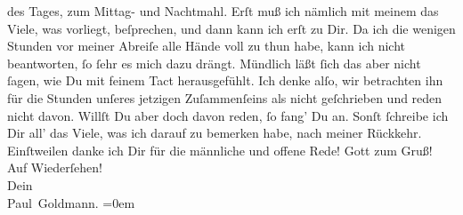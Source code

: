                des Tages, zum Mittag- und Nachtmahl. Erſt muß ich nämlich mit meinem \label{K_L02650-2v}\label{K_L02650-2h} das Viele, was vorliegt, beſprechen, und dann kann ich erſt
               zu Dir.\pend
           \pstart
           {\pb}Da ich die wenigen Stunden vor meiner Abreiſe alle
               Hände voll zu thun habe, kann ich \label{K_L02650-11v}\label{K_L02650-11h} nicht beantworten, ſo ſehr  es mich dazu drängt. Mündlich läßt ſich das aber nicht ſagen, wie Du
               mit feinem Tact herausgefühlt. Ich denke alſo, wir betrachten ihn für die Stunden
               unſeres jetzigen Zuſammenſeins als nicht geſchrieben und reden nicht davon. Willſt Du
               aber doch davon reden, ſo fang’ Du an. Sonſt ſchreibe ich Dir all’ das Viele, was ich
               darauf zu bemerken habe, nach meiner Rückkehr. Einſtweilen danke ich Dir für die
               männliche und offene Rede!\pend
           \pstart
           Gott zum Gruß! Auf Wiederſehen! {\\[\baselineskip]} Dein {\\[\baselineskip]}\spacefill\mbox{Paul Goldmann.}\pend
           \leftskip=0em{}\endnumbering{}  
      